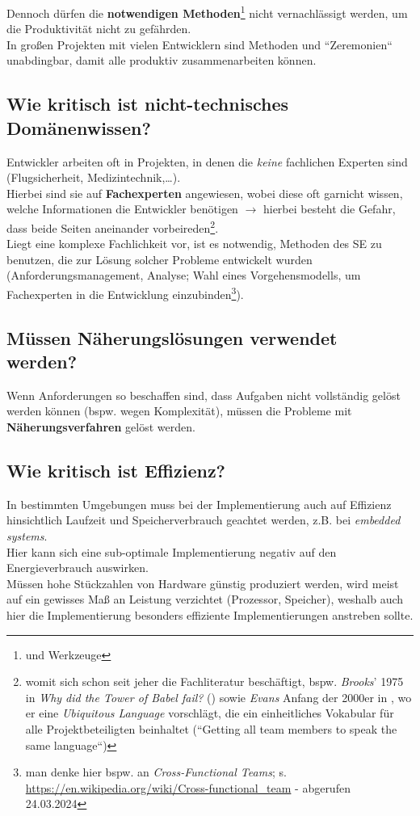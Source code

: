 \noindent
Dennoch dürfen die \textbf{notwendigen Methoden}\footnote{und Werkzeuge} nicht vernachlässigt werden, um die Produktivität nicht zu gefährden.\\

\noindent
In großen Projekten mit vielen Entwicklern sind Methoden und ``Zeremonien`` unabdingbar, damit alle produktiv zusammenarbeiten können.

\subsection{Wie kritisch ist nicht-technisches Domänenwissen?}
Entwickler arbeiten oft in Projekten, in denen die \textit{keine} fachlichen Experten sind (Flugsicherheit, Medizintechnik,\ldots).\\
Hierbei sind sie auf \textbf{Fachexperten} angewiesen, wobei diese oft garnicht wissen, welche Informationen die Entwickler benötigen $\rightarrow$ hierbei besteht die Gefahr, dass beide Seiten aneinander vorbeireden\footnote{
womit sich schon seit jeher die Fachliteratur beschäftigt, bspw. \textit{Brooks}' 1975 in \textit{Why did the Tower of Babel fail?} (\cite{Bro95}) sowie \textit{Evans} Anfang der 2000er in \cite{Eva03}, wo er eine \textit{Ubiquitous Language} vorschlägt, die ein einheitliches Vokabular für alle Projektbeteiligten beinhaltet (``Getting all team members to speak the same language``)
}.\\
Liegt eine komplexe Fachlichkeit vor, ist es notwendig, Methoden des SE zu benutzen, die zur Lösung solcher Probleme entwickelt wurden (Anforderungsmanagement, Analyse; Wahl eines Vorgehensmodells, um Fachexperten in die Entwicklung einzubinden\footnote{
man denke hier bspw. an \textit{Cross-Functional Teams}; s. \url{https://en.wikipedia.org/wiki/Cross-functional_team} - abgerufen 24.03.2024
}).\\

\subsection{Müssen Näherungslösungen verwendet werden?}
Wenn Anforderungen so beschaffen sind, dass Aufgaben nicht vollständig gelöst werden können (bspw. wegen Komplexität), müssen die Probleme mit \textbf{Näherungsverfahren} gelöst werden.\\

\subsection{Wie kritisch ist Effizienz?}
In bestimmten Umgebungen muss bei der Implementierung auch auf Effizienz hinsichtlich Laufzeit und Speicherverbrauch geachtet werden, z.B. bei \textit{embedded systems}.\\
Hier kann sich eine sub-optimale Implementierung negativ auf den Energieverbrauch auswirken.\\
Müssen hohe Stückzahlen von Hardware günstig produziert werden, wird meist auf ein gewisses Maß an Leistung verzichtet (Prozessor, Speicher), weshalb auch hier die Implementierung besonders effiziente Implementierungen anstreben sollte.\\

